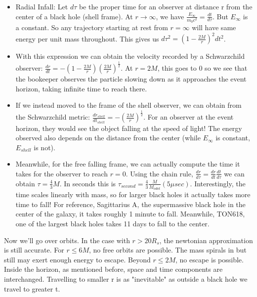 \documentclass[11pt]{article}
\begin{document}
\begin{itemize}
    \item Radial Infall: Let $d\tau$ be the proper time for an observer at distance r from the center of a black hole (shell frame). 
    At $r \rightarrow \infty$, we have $\frac{E_\infty}{m_0 c^2} = \frac{dt}{d\tau}$. But $E_\infty$ is a constant. So any trajectory starting at rest from $r = \infty$ will have
    same energy per unit mass throughout. This gives us $d\tau ^2  = (1- \frac{2M}{r})^2 dt^2$.

    \item With this expression we can obtain the velocity recorded by a Schwarzchild observer:   
    \newline$\frac{dr}{dt} = -(1-\frac{2M}{r})(\frac{2M}{r})^{\frac{1}{2}}$. At $r = 2M$, this goes to 0 so we see that the bookeeper observes the particle slowing down as it approaches the event horizon,
    taking infinite time to reach there.

    \item If we instead moved to the frame of the shell observer, we can obtain from the Schwarzchild metric: $\frac{dr_{shell}}{dt_{shell}} = -(\frac{2M}{r})^\frac{1}{2}$. For an observer at the event horizon,
    they would see the object falling at the speed of light! The energy observed also depends on the distance from the center (while $E_{\infty}$ is constant, $E_{shell}$ is not).

    \item Meanwhile, for the free falling frame, we can actually compute the time it takes for the observer to reach $r = 0$. Using the chain rule, $\frac{dr}{d\tau} = \frac{dr}{dt}\frac{dt}{d\tau}$ we can obtain 
    $\tau = \frac{4}{3}M$. In seconds this is $\tau_{second} = \frac{4}{3}\frac{M}{M_{odot}}(5\mu sec)$. Interestingly, the time scales linearly with mass, so for larger black holes it actually takes more time to
    fall! For reference, Sagittarius A, the supermassive black hole in the center of the galaxy, it takes roughly 1 minute to fall. Meanwhile, TON618, one of the largest black holes takes 11 days to fall to the center.

\end{itemize}

\noindent Now we'll go over orbits. In the case with $r > 20R_{s}$, the newtonian approximation is still accurate. For $r \leq 6M$, no free orbits are possible. The mass spirals in but still may exert enough energy to escape.
Beyond $r \leq 2M$, no escape is possible. Inside the horizon, as mentioned before, space and time components are interchanged. Travelling to smaller r is as "inevitable" as outside a black hole we travel to greater t.
\end{document}
